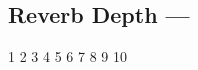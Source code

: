 \subsection[Reverb Depth]{Reverb Depth --- \UiKey{\SET}}










































1
2
3
4
5
6
7
8
9
10
